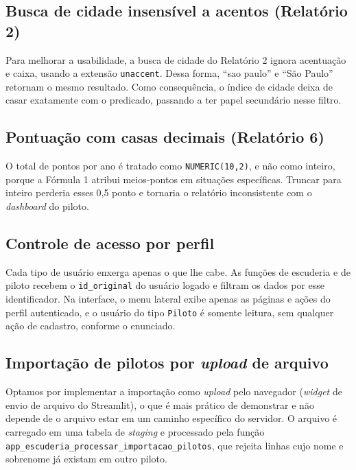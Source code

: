 \documentclass[12pt,a4paper]{article}
\begin{document}
\subsection{Busca de cidade insensível a acentos (Relatório 2)}

Para melhorar a usabilidade, a busca de cidade do Relatório 2 ignora acentuação e caixa, usando a extensão \texttt{unaccent}. Dessa forma, ``sao paulo'' e ``São Paulo'' retornam o mesmo resultado. Como consequência, o índice de cidade deixa de casar exatamente com o predicado, passando a ter papel secundário nesse filtro.

\subsection{Pontuação com casas decimais (Relatório 6)}

O total de pontos por ano é tratado como \texttt{NUMERIC(10,2)}, e não como inteiro, porque a Fórmula 1 atribui meios-pontos em situações específicas. Truncar para inteiro perderia esses 0,5 ponto e tornaria o relatório inconsistente com o \textit{dashboard} do piloto.

\subsection{Controle de acesso por perfil}

Cada tipo de usuário enxerga apenas o que lhe cabe. As funções de escuderia e de piloto recebem o \texttt{id\_original} do usuário logado e filtram os dados por esse identificador. Na interface, o menu lateral exibe apenas as páginas e ações do perfil autenticado, e o usuário do tipo \texttt{Piloto} é somente leitura, sem qualquer ação de cadastro, conforme o enunciado.

\subsection{Importação de pilotos por \textit{upload} de arquivo}

Optamos por implementar a importação como \textit{upload} pelo navegador (\textit{widget} de envio de arquivo do Streamlit), o que é mais prático de demonstrar e não depende de o arquivo estar em um caminho específico do servidor. O arquivo é carregado em uma tabela de \textit{staging} e processado pela função \texttt{app\_escuderia\_processar\_importacao\_pilotos}, que rejeita linhas cujo nome e sobrenome já existam em outro piloto.
\end{document}
